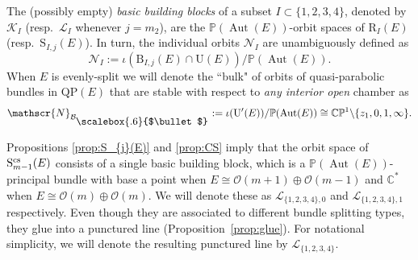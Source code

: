 \documentclass[10pt,a4paper]{amsart}
\newcommand{\field}[1]{\ensuremath{\mathbb{#1}}}
\newcommand{\CC}{\field{C}}
\newcommand{\PP}{\field{P}}
\newcommand{\calO}{\mathcal{O}}
\newcommand\sbul[1][.6]{\mathbin{\vcenter{\hbox{\scalebox{#1}{$\bullet$}}}}}
\newcommand{\curly}[1]{\mathscr{#1}}
\newcommand{\cK}{\curly{K}}
\newcommand{\cL}{\curly{L}}
\newcommand{\cN}{\curly{N}}
\newcommand{\qB}{\mathcal{B}}
\DeclareMathOperator{\Aut}{Aut}
\numberwithin{equation}{section}
\begin{document}
\begin{Definition}\label{def:b-b-b}
The (possibly empty) \textit{basic building blocks} of a subset $I\subset\{1,2,3,4\}$, denoted by $\cK_{I}$ (resp.~$\cL_{I}$ whenever $j=m_{2}$), are the $\PP(\Aut(E))$-orbit spaces of $\mathrm{R}_{I}(E)$ (resp.~$\mathrm{S}_{I,j}(E)$). In turn, the individual orbits $\cN_{I}$ are unambiguously defined as
\[
\cN_{I}:=\iota(\mathrm{B}_{I,j}(E)\cap \mathrm{U}(E))/\PP(\Aut(E)).
\]
When $E$ is evenly-split we will denote the ``bulk" of orbits of quasi-parabolic bundles in $\mathrm{QP}(E)$ that are stable with respect to \textit{any interior open} chamber as
\[
\cN_{\qB_{\sbul}}:= \iota(\mathrm{U}'(E))/\PP(\Aut(E))\cong\CC\PP^{1}\backslash\{z_{1},0,1,\infty\}.
\]
\end{Definition}

Propositions \ref{prop:S_{j}(E)} and \ref{prop:CS} imply that the orbit space of $\mathrm{S}^{\rm cs}_{m-1}(E)$ consists of a single basic building block, which is a $\PP(\Aut(E))$-principal bundle with base a point when $E\cong \calO(m+1)\oplus\calO(m-1)$ and $\CC^{*}$ when $E\cong\calO(m)\oplus\calO(m)$. We will denote these as $\cL_{\{1,2,3,4\},0}$ and $\cL_{\{1,2,3,4\},1}$ respectively. Even though they are associated to different bundle splitting types, they glue into a punctured line (Proposition~\ref{prop:glue}). For notational simplicity, we will denote the resulting punctured line by $\cL_{\{1,2,3,4\}}$.
\end{document}

